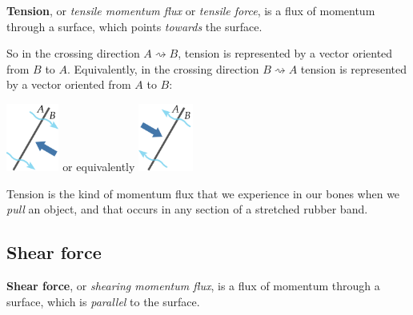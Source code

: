 \documentclass[a4paper,12pt,%
onecolumn,oneside,%
british%
]{memoir}
\providecommand{\href}[2]{#2}
\renewcommand*{\|}[1][]{\nonscript\:#1\vert\nonscript\:\mathopen{}}
\newcommand*{\furl}[2]{\href{#1}{#2}\pagenote{\url{#1}}}
\begin{document}
\textbf{Tension}, or \emph{tensile momentum flux} or \emph{tensile force}, is a flux of momentum through a surface, which points \emph{towards} the surface.

So in the crossing direction $A\!\rightsquigarrow\!B$, tension is represented by a vector oriented from $B$ to $A$. Equivalently, in the crossing direction $B\!\rightsquigarrow\!A$ tension is represented by a vector oriented from $A$ to $B$:\noprelistbreak
\begin{center}\medskip
  \hspace*{\fill}
  \includegraphics[align=c,height=6em]{images/tension_right.pdf}
  \hfill{\small or equivalently}\hfill
  \includegraphics[align=c,height=6em]{images/tension_left.pdf}
  \hspace*{\fill}
\end{center}

Tension is the kind of momentum flux that we experience in our bones when we \emph{pull} an object, and that occurs in any section of a stretched rubber band.

\subsection{Shear force}
\label{sec:shear}

\textbf{Shear force}, or \emph{shearing momentum flux}, is a flux of momentum through a surface, which is \emph{parallel} to the surface.
\end{document}
